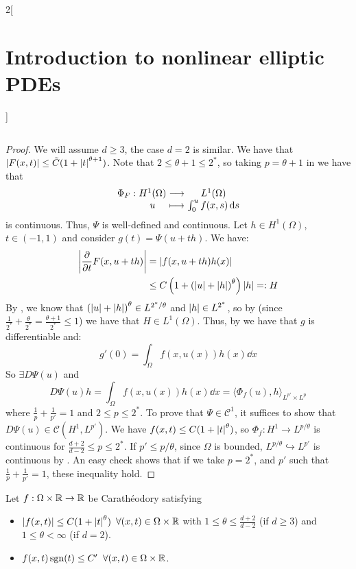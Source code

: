 \documentclass[../../../main_math.tex]{subfiles}
\begin{document}
\begin{multicols}{2}[\section{Introduction to nonlinear elliptic PDEs}]
\begin{proposition}
$$    $$
  \end{proposition}
  \begin{proof}
    We will assume $d\geq 3$, the case $d=2$ is similar. We have that $\abs{F(x,t)}\leq \tilde{C}(1+\abs{t}^{\theta+1})$. Note that $2\leq \theta+1\leq 2^*$, so taking $p=\theta+1$ in  we have that
    $$
      \function{\Phi_F}{H^1(\Omega)}{L^{1}(\Omega)}{u}{\int_0^{u}f(x,s)\dd{s}}
    $$
    is continuous. Thus, $\Psi$ is well-defined and continuous. Let $h\in H^1(\Omega)$, $t\in (-1,1)$ and consider $g(t)=\Psi(u+th)$. We have:
    \begin{align*}
      \abs{\pdv{}{t}F(x,u+th)} & =\abs{f(x,u+th)h(x)}                                      \\
                               & \leq C\left(1+{(\abs{u}+\abs{h})}^\theta\right)\abs{h}=:H
    \end{align*}
    By , we know that ${(\abs{u}+\abs{h})}^\theta\in L^{2^*/\theta}$ and $\abs{h}\in L^{2^*}$, so by  (since $\frac{1}{2^*}+\frac{\theta}{2^*}=\frac{\theta+1}{2^*}\leq 1$) we have that $H\in L^1(\Omega)$. Thus, by  we have that $g$ is differentiable and:
    $$
      g'(0)=\int_\Omega f(x,u(x))h(x)\dd{x}
    $$
    So $\exists D\Psi(u)$ and $$
      D\Psi(u)h=\int_\Omega f(x,u(x))h(x)\dd{x}={\langle \Phi_f(u), h\rangle}_{L^{p'}\times L^p}
    $$
    where $\frac{1}{p}+\frac{1}{p'}=1$ and $2\leq p\leq 2^*$. To prove that $\Psi\in\mathcal{C}^1$, it suffices to show that $D\Psi(u)\in \mathcal{C}(H^1,L^{p'})$. We have $f(x,t)\leq C(1+\abs{t}^\theta)$, so $\Phi_f:H^1\to L^{p/\theta}$ is continuous for $\frac{d+2}{d-2}\leq p\leq 2^*$. If $p'\leq p/\theta$, since $\Omega$ is bounded, $L^{p/\theta}\hookrightarrow L^{p'}$ is continuous by . An easy check shows that if we take $p=2^*$, and $p'$ such that $\frac{1}{p}+\frac{1}{p'}=1$, these inequality hold.
  \end{proof}
  \begin{theorem}
    Let $f:\Omega\times \mathbb{R}\to\mathbb{R}$ be Carathéodory satisfying
    \begin{itemize}
      \item $\abs{f(x,t)}\leq C(1+\abs{t}^\theta)$ $\forall (x,t)\in \Omega\times \mathbb{R}$ with $1\leq \theta\leq \frac{d+2}{d-2}$ (if $d\geq 3$) and $1\leq \theta<\infty$ (if $d=2$).
      \item $f(x,t)\operatorname{sgn}(t)\leq C'$ $\forall (x,t)\in \Omega\times \mathbb{R}$.
    \end{itemize}

\end{theorem}
\end{multicols}
\end{document}
